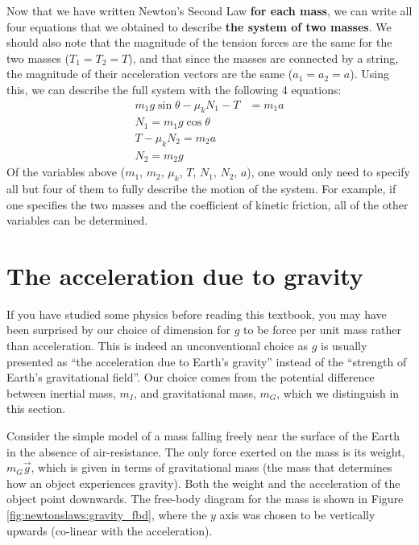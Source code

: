 \begin{example}
Now that we have written Newton's Second Law \textbf{for each mass}, we can write all four equations that we obtained to describe \textbf{the system of two masses}. We should also note that the magnitude of the tension forces are the same for the two masses ($T_1=T_2=T$), and that since the masses are connected by a string, the magnitude of their acceleration vectors are the same ($a_1=a_2=a$). Using this, we can describe the full system with the following 4 equations:
\begin{align*}
m_1 g\sin\theta -\mu_k N_1 - T &= m_1 a\\
N_1=m_1g\cos\theta\\
T - \mu_k N_2 = m_2 a\\
N_2 = m_2g
\end{align*}
Of the variables above ($m_1$, $m_2$, $\mu_k$, $T$, $N_1$, $N_2$, $a$), one would only need to specify all but four of them to fully describe the motion of the system. For example, if one specifies the two masses and the coefficient of kinetic friction, all of the other variables can be determined.
\end{example}

\section{The acceleration due to gravity}
If you have studied some physics before reading this textbook, you may have been surprised by our choice of dimension for $g$ to be force per unit mass rather than acceleration. This is indeed an unconventional choice as $g$ is usually presented as ``the acceleration due to Earth's gravity'' instead of the ``strength of Earth's gravitational field''. Our choice comes from the potential difference between inertial mass, $m_I$, and gravitational mass, $m_G$, which we distinguish in this section.

Consider the simple model of a mass falling freely near the surface of the Earth in the absence of air-resistance. The only force exerted on the mass is its weight, $m_G\vec g$, which is given in terms of gravitational mass (the mass that determines how an object experiences gravity). Both the weight and the acceleration of the object point downwards. The free-body diagram for the mass is shown in Figure \ref{fig:newtonslaws:gravity_fbd}, where the $y$ axis was chosen to be vertically upwards (co-linear with the acceleration).


